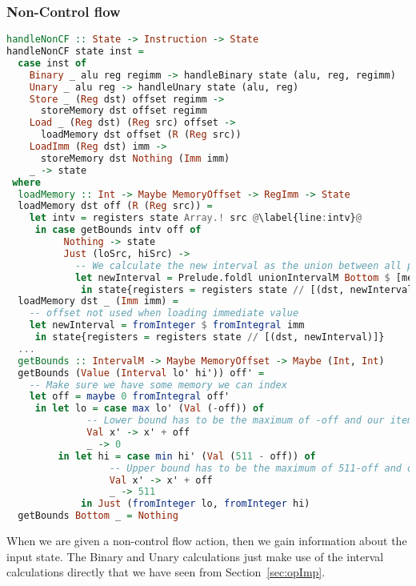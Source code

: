 \subsubsection{Non-Control flow}
\begin{lstlisting}[language={haskell}, caption={handleNonCF}, label={lst:handleNonCF}, escapechar=@]
handleNonCF :: State -> Instruction -> State
handleNonCF state inst =
  case inst of
    Binary _ alu reg regimm -> handleBinary state (alu, reg, regimm)
    Unary _ alu reg -> handleUnary state (alu, reg)
    Store _ (Reg dst) offset regimm ->
      storeMemory dst offset regimm
    Load _ (Reg dst) (Reg src) offset ->
      loadMemory dst offset (R (Reg src))
    LoadImm (Reg dst) imm ->
      storeMemory dst Nothing (Imm imm)
    _ -> state
 where
  loadMemory :: Int -> Maybe MemoryOffset -> RegImm -> State
  loadMemory dst off (R (Reg src)) =
    let intv = registers state Array.! src @\label{line:intv}@
     in case getBounds intv off of
          Nothing -> state
          Just (loSrc, hiSrc) ->
            -- We calculate the new interval as the union between all possible memory locations
            let newInterval = Prelude.foldl unionIntervalM Bottom $ [memory state Array.! i | i <- [loSrc .. hiSrc]] @\label{line:newInterval}@
             in state{registers = registers state // [(dst, newInterval)]}
  loadMemory dst _ (Imm imm) =
    -- offset not used when loading immediate value
    let newInterval = fromInteger $ fromIntegral imm
     in state{registers = registers state // [(dst, newInterval)]}
  ...
  getBounds :: IntervalM -> Maybe MemoryOffset -> Maybe (Int, Int)
  getBounds (Value (Interval lo' hi')) off' =
    -- Make sure we have some memory we can index
    let off = maybe 0 fromIntegral off'
     in let lo = case max lo' (Val (-off)) of
              -- Lower bound has to be the maximum of -off and our item. We then add off after
              Val x' -> x' + off
              _ -> 0
         in let hi = case min hi' (Val (511 - off)) of
                  -- Upper bound has to be the maximum of 511-off and our item. We then add off after
                  Val x' -> x' + off
                  _ -> 511
             in Just (fromInteger lo, fromInteger hi)
  getBounds Bottom _ = Nothing
\end{lstlisting}


When we are given a non-control flow action, then we gain information about the
input state. The Binary and Unary calculations just make use of the interval
calculations directly that we have seen from Section~\ref{sec:opImp}.

